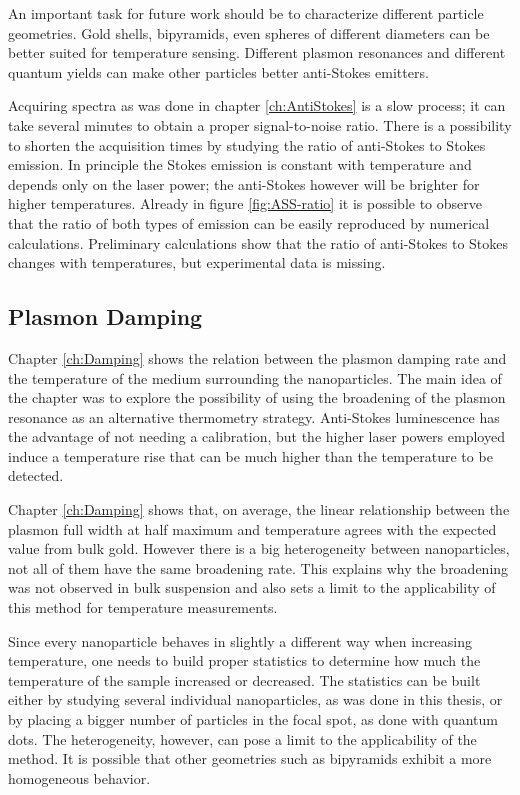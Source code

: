 An important task for future work should be to characterize different particle
geometries. Gold shells\cite{Gobin2007}, bipyramids\cite{Rao2015}, even spheres
of different diameters can be better suited for temperature sensing. Different
plasmon resonances and different quantum yields can make other particles better
anti-Stokes emitters.

Acquiring spectra as was done in chapter \ref{ch:AntiStokes} is a slow process;
it can take several minutes to obtain a proper signal-to-noise ratio. There is a
possibility to shorten the acquisition times by studying the ratio of
anti-Stokes to Stokes emission\cite{Pozzi2015}. In principle the Stokes emission
is constant with temperature and depends only on the laser power; the
anti-Stokes however will be brighter for higher temperatures. Already in figure
\ref{fig:ASS-ratio} it is possible to observe that the ratio of both types of
emission can be easily reproduced by numerical calculations. Preliminary
calculations show that the ratio of anti-Stokes to Stokes changes with
temperatures, but experimental data is missing.

\subsection{Plasmon Damping}
Chapter \ref{ch:Damping} shows the relation between the plasmon damping rate and
the temperature of the medium surrounding the nanoparticles. The main idea of
the chapter was to explore the possibility of using the broadening of the
plasmon resonance as an alternative thermometry strategy. Anti-Stokes
luminescence has the advantage of not needing a calibration, but the higher
laser powers employed induce a temperature rise that can be much higher than the
temperature to be detected.

Chapter \ref{ch:Damping} shows that, on average, the linear relationship between
the plasmon full width at half maximum and temperature agrees with the expected
value from bulk gold. However there is a big heterogeneity between 
nanoparticles, not all of them have the same broadening rate. This explains why
the broadening was not observed in bulk suspension and also sets a limit to the
applicability of this method for temperature measurements. 

Since every nanoparticle behaves in slightly a different way when increasing
temperature, one needs to build proper statistics to determine how much the
temperature of the sample increased or decreased. The statistics can be built
either by studying several individual nanoparticles, as was done in this thesis,
or by placing a bigger number of particles in the focal spot, as done with
quantum dots\cite{Li2007}. The heterogeneity, however, can pose a limit to the
applicability of the method. It is possible that other geometries such as
bipyramids exhibit a more homogeneous behavior.

